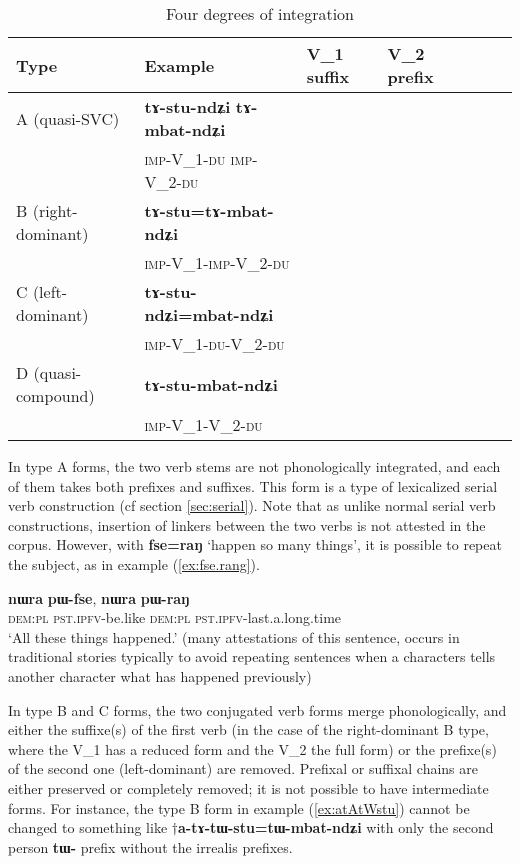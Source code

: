 \documentclass[oneside,a4paper,11pt]{article}
\newcommand{\ipa}[1]{{\phon\textbf{#1}}}
\newcommand{\Y}{\Checkmark}
\newcommand{\N}{}
\newcommand{\jpg}[2]{\ipa{#1} `#2'}
\newcommand{\refb}[1]{(\ref{#1})}
\begin{document}
\begin{table}[H]
\caption{Four degrees of integration} \centering \label{tab:four}
\begin{tabular}{lllllll}
\toprule
Type & Example & V_1 suffix & V_2 prefix \\
\midrule
A (quasi-SVC) & \ipa{tɤ-stu-ndʑi} \ipa{tɤ-mbat-ndʑi} &\Y &\Y \\
 &\textsc{imp}-V_1-\textsc{du}  \textsc{imp}-V_2-\textsc{du} \\
B (right-dominant) & \ipa{tɤ-stu=tɤ-mbat-ndʑi} &\N  &\Y \\
 &\textsc{imp}-V_1-\textsc{imp}-V_2-\textsc{du} \\
C (left-dominant) & \ipa{tɤ-stu-ndʑi=mbat-ndʑi} &\Y  &\N \\
 &\textsc{imp}-V_1-\textsc{du}-V_2-\textsc{du} \\
D (quasi-compound)& \ipa{tɤ-stu-mbat-ndʑi} &\N  &\N \\
 &\textsc{imp}-V_1-V_2-\textsc{du} \\
\bottomrule
\end{tabular}
\end{table}

In type A forms, the two verb stems are not phonologically integrated, and each of them takes both prefixes and suffixes. This form is a type of lexicalized serial verb construction (cf section \ref{sec:serial}). Note that as unlike normal serial verb constructions, insertion of linkers between the two verbs is not attested in the corpus. However, with \jpg{fse=raŋ}{happen so many things}, it is possible to repeat the subject, as in example \refb{ex:fse.rang}.

\begin{exe}
\ex \label{ex:fse.rang}
\gll 
\ipa{nɯra} \ipa{pɯ-fse}, \ipa{nɯra} \ipa{pɯ-raŋ} \\
\textsc{dem:pl} \textsc{pst.ipfv}-be.like \textsc{dem:pl} \textsc{pst.ipfv}-last.a.long.time \\ 
\glt `All these things happened.' (many attestations of this sentence, occurs in traditional stories typically to avoid repeating sentences when a characters tells another character what has happened previously)
\end{exe}

In type B and C forms, the two conjugated verb forms merge phonologically, and either the suffixe(s) of the first verb (in the case of the right-dominant B type, where the V_1 has a reduced form and the V_2 the full form) or the prefixe(s) of the second one (left-dominant) are removed. Prefixal or suffixal chains are either preserved or completely removed; it is not possible to have intermediate forms. For instance, the type B form in example \refb{ex:atAtWstu} cannot be changed to something like $\dagger$\ipa{a-tɤ-tɯ-stu=tɯ-mbat-ndʑi} with only the second person \ipa{tɯ-} prefix without the irrealis prefixes.
\end{document}
